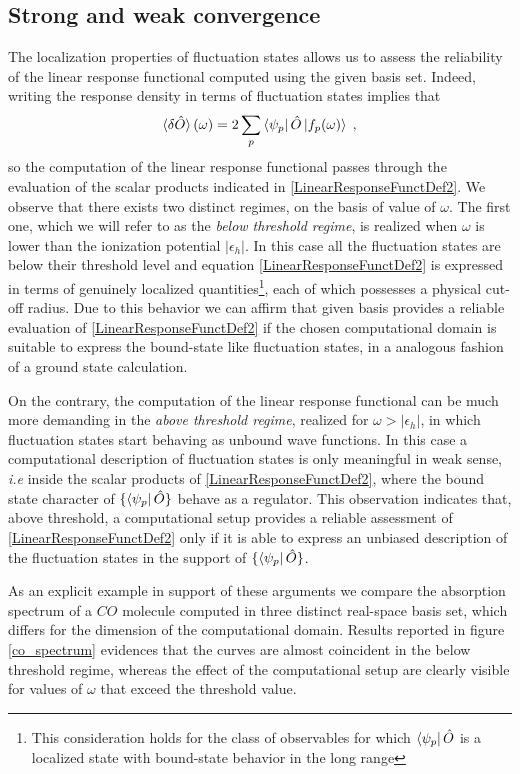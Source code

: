 \documentclass[reprint,aps,prb]{revtex4-1}
\newcommand{\eps}{\epsilon}
\newcommand{\be}{\begin{equation}}
\newcommand{\ee}{\end{equation}}
\newcommand{\lb}{\label}
\newcommand{\op}[1]{\hat {#1}}
\begin{document}
\subsection{Strong and weak convergence}

The localization properties of fluctuation states allows us to assess the reliability of the linear response functional computed using the given basis set. Indeed, writing the response 
density in terms of fluctuation states implies that 
\be\lb{LinearResponseFunctDef2}
\braket{\delta\op O}(\omega) = 2\sum_p \bra{\psi_p}\op O\ket{f_p(\omega)} \;,
\ee
so the computation of the linear response functional passes through the evaluation of the scalar products indicated in \eqref{LinearResponseFunctDef2}. We observe that there exists two 
distinct regimes, on the basis of value of $\omega$. The first one, which we will refer to as the \emph{below threshold regime}, is realized when $\omega$ is lower than the ionization 
potential $|\eps_h|$. In this case all the fluctuation states are below their threshold level and equation \eqref{LinearResponseFunctDef2} is expressed in terms of genuinely localized 
quantities\footnote{This consideration holds for the class of observables for which $\bra{\psi_p}\op O$ is a localized state  with bound-state behavior in the long range}, each of which 
possesses a physical cut-off radius. Due to this behavior we can affirm that given basis provides a reliable evaluation of \eqref{LinearResponseFunctDef2} if the chosen computational domain 
is suitable to express the bound-state like fluctuation states, in a analogous fashion of a ground state calculation. 

On the contrary, the computation of the linear response functional can be much more demanding in the \emph{above threshold regime}, realized for $\omega>|\eps_h|$, in which fluctuation 
states start behaving as unbound wave functions. In this case a computational description of fluctuation states is only meaningful in weak sense, \emph{i.e} inside the scalar products of 
\eqref{LinearResponseFunctDef2}, where the bound state character of $\{\bra{\psi_p}\op O\}$ behave as a regulator. This observation indicates that, above threshold, a computational setup 
provides a reliable assessment of \eqref{LinearResponseFunctDef2} only if it is able to express an unbiased description of the fluctuation states in the support of $\{\bra{\psi_p}\op O\}$. 

As an explicit example in support of these arguments we compare the absorption spectrum of a $CO$ molecule computed in three distinct real-space basis set, which differs for the dimension of 
the computational domain. Results reported in figure \ref{co_spectrum} evidences that the curves are almost coincident in the below threshold regime, whereas the effect of the computational 
setup are clearly visible for values of $\omega$ that exceed the threshold value. 
\end{document}

